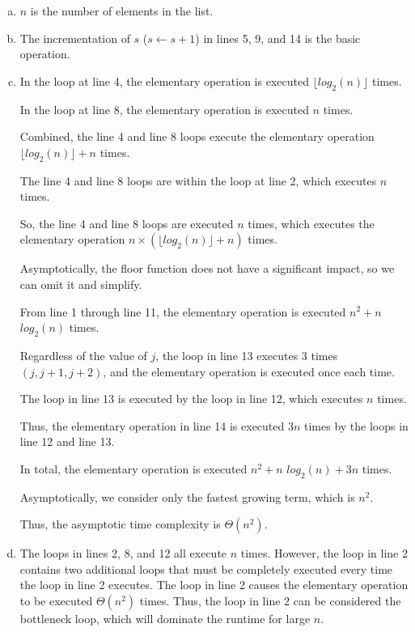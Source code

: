\documentclass{article}
\begin{document}
	\begin{enumerate}[a.]
		\item $n$ is the number of elements in the list.
		
		\item The incrementation of $s$ ($s \leftarrow s + 1$) in lines 5, 9, and 14 is the basic operation.
		
		\item In the loop at line 4, the elementary operation is executed $\lfloor log_{2}(n) \rfloor$ times.
		
			In the loop at line 8, the elementary operation is executed $n$ times.
			
			Combined, the line 4 and line 8 loops execute the elementary operation $\lfloor log_{2}(n) \rfloor + n$ times.
			
			The line 4 and line 8 loops are within the loop at line 2, which executes $n$ times.
			
			So, the line 4 and line 8 loops are executed $n$ times, which executes the elementary operation $n \times (\lfloor log_{2}(n) \rfloor + n)$ times.
			
			Asymptotically, the floor function does not have a significant impact, so we can omit it and simplify.
			
			From line 1 through line 11, the elementary operation is executed $n^2 + n$ $log_{2}(n)$ times.
			
			Regardless of the value of $j$, the loop in line 13 executes 3 times $(j, j + 1, j + 2)$, and the elementary operation is executed once each time.
			
			The loop in line 13 is executed by the loop in line 12, which executes $n$ times.
			
			Thus, the elementary operation in line 14 is executed $3n$ times by the loops in line 12 and line 13.
			
			In total, the elementary operation is executed $n^2 + n$ $log_{2}(n) + 3n$ times.
			
			Asymptotically, we consider only the fastest growing term, which is $n^2$.
			
			Thus, the asymptotic time complexity is $\Theta(n^2)$.
	
		\item The loops in lines 2, 8, and 12 all execute $n$ times.  However, the loop in line 2 contains two additional loops that must be completely executed every time the loop in line 2 executes.  The loop in line 2 causes the elementary operation to be executed $\Theta(n^2)$ times.  Thus, the loop in line 2 can be considered the bottleneck loop, which will dominate the runtime for large $n$.
	\end{enumerate}
\end{document}
